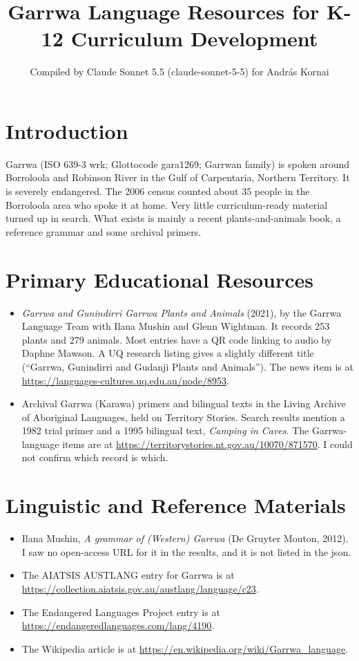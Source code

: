 \documentclass[12pt]{article}
\title{Garrwa Language Resources for K-12 Curriculum Development}
\author{Compiled by Claude Sonnet 5.5 (claude-sonnet-5-5) for Andr\'as Kornai}
\date{}
\begin{document}
\maketitle

\section{Introduction}
Garrwa (ISO 639-3 wrk; Glottocode gara1269; Garrwan family) is spoken around Borroloola and Robinson River in the Gulf of Carpentaria, Northern Territory. It is severely endangered. The 2006 census counted about 35 people in the Borroloola area who spoke it at home. Very little curriculum-ready material turned up in search. What exists is mainly a recent plants-and-animals book, a reference grammar and some archival primers.

\section{Primary Educational Resources}
\begin{itemize}
\item \emph{Garrwa and Gunindirri Garrwa Plants and Animals} (2021), by the Garrwa Language Team with Ilana Mushin and Glenn Wightman. It records 253 plants and 279 animals. Most entries have a QR code linking to audio by Daphne Mawson. A UQ research listing gives a slightly different title (``Garrwa, Gunindirri and Gudanji Plants and Animals''). The news item is at \url{https://languages-cultures.uq.edu.au/node/8953}.
\item Archival Garrwa (Karawa) primers and bilingual texts in the Living Archive of Aboriginal Languages, held on Territory Stories. Search results mention a 1982 trial primer and a 1995 bilingual text, \emph{Camping in Caves}. The Garrwa-language items are at \url{https://territorystories.nt.gov.au/10070/871570}. I could not confirm which record is which.
\end{itemize}

\section{Linguistic and Reference Materials}
\begin{itemize}
\item Ilana Mushin, \emph{A grammar of (Western) Garrwa} (De Gruyter Mouton, 2012). I saw no open-access URL for it in the results, and it is not listed in the json.
\item The AIATSIS AUSTLANG entry for Garrwa is at \url{https://collection.aiatsis.gov.au/austlang/language/c23}.
\item The Endangered Languages Project entry is at \url{https://endangeredlanguages.com/lang/4190}.
\item The Wikipedia article is at \url{https://en.wikipedia.org/wiki/Garrwa_language}.
\end{itemize}
\end{document}
